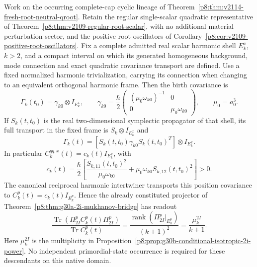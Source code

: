\documentclass[12pt,a4paper]{article}
\begin{document}
\begin{corollary}
\label{p8:cor:native-cyclic-shell-covariance}
Work on the occurring complete-cap cyclic lineage of
Theorem~\ref{p8:thm:v2114-fresh-root-neutral-qroot}.  Retain the regular
single-scalar quadratic representative of
Theorem~\ref{p8:thm:v2109-regular-root-scalar}, with no additional material
perturbation sector, and the positive root oscillators of
Corollary~\ref{p8:cor:v2109-positive-root-oscillators}.  Fix a complete
admitted real scalar harmonic shell \(E_k^x\), \(k>2\), and a compact interval
on which its generated homogeneous background, mode connection and exact
quadratic covariance transport are defined.  Use a fixed normalized harmonic
trivialization, carrying its connection when changing to an equivalent
orthogonal harmonic frame.  Then
the birth covariance is
\begin{equation}
\label{p8:eq:native-cyclic-shell-root-covariance}
 \Gamma_k(t_0)=\gamma_{k0}\otimes I_{E_k^x},\qquad
 \gamma_{k0}=\frac{\hbar}{2}
 \begin{pmatrix}
  (\mu_0\omega_{k0})^{-1}&0\\
  0&\mu_0\omega_{k0}
 \end{pmatrix},\qquad \mu_0=a_0^3.
\end{equation}
If \(S_k(t,t_0)\) is the real two-dimensional symplectic propagator of that
shell, its full transport in the fixed frame is \(S_k\otimes I_{E_k^x}\) and
\begin{equation}
\label{p8:eq:native-cyclic-shell-evolved-covariance}
 \boxed{\Gamma_k(t)=
 [S_k(t,t_0)\gamma_{k0}S_k(t,t_0)^T]\otimes I_{E_k^x}.}
\end{equation}
In particular \(C_k^{qq,x}(t)=c_k(t)I_{E_k^x}\), with
\[
 c_k(t)=\frac{\hbar}{2}\left[
 \frac{S_{k,11}(t,t_0)^2}{\mu_0\omega_{k0}}
 +\mu_0\omega_{k0}S_{k,12}(t,t_0)^2\right]>0.
\]
The canonical reciprocal harmonic intertwiner transports this position
covariance to \(C_k^p(t)=c_k(t)I_{E_k^p}\).  Hence the already constituted
projector of Theorem~\ref{p8:thm:g30a-2i-mukhanov-bridge} has readout
\begin{equation}
\label{p8:eq:native-cyclic-2i-trace-fraction}
 \boxed{\frac{\operatorname{Tr}(\Pi_{2I}^pC_k^p(t)\Pi_{2I}^p)}
 {\operatorname{Tr}C_k^p(t)}
 =\frac{\operatorname{rank}(\Pi_{2I}^p|_{E_k^p})}{(k+1)^2}
 =\frac{\mu_k^{2I}}{k+1}.}
\end{equation}
Here \(\mu_k^{2I}\) is the multiplicity in
Proposition~\ref{p8:prop:g30b-conditional-isotropic-2i-power}.
No independent primordial-state occurrence is required for these descendants
on this native domain.
\end{corollary}
\end{document}
